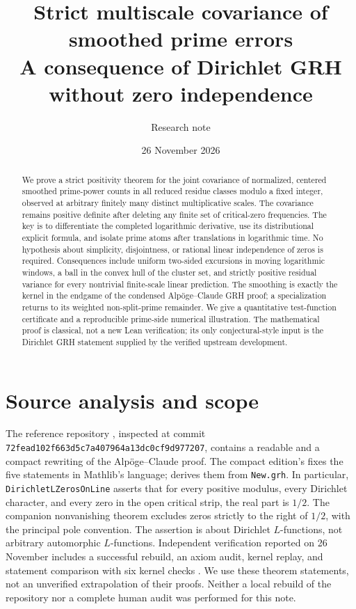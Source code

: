 \documentclass[11pt]{article}
\title{Strict multiscale covariance of smoothed prime errors\\[3pt]\large A consequence of Dirichlet GRH without zero independence}
\author{Research note}
\date{26 November 2026}
\theoremstyle{remark}\newtheorem{remark}[theorem]{Remark}
\begin{document}
\maketitle
\begin{abstract}
We prove a strict positivity theorem for the joint covariance of normalized, centered smoothed prime-power counts in all reduced residue classes modulo a fixed integer, observed at arbitrary finitely many distinct multiplicative scales. The covariance remains positive definite after deleting any finite set of critical-zero frequencies. The key is to differentiate the completed logarithmic derivative, use its distributional explicit formula, and isolate prime atoms after translations in logarithmic time. No hypothesis about simplicity, disjointness, or rational linear independence of zeros is required. Consequences include uniform two-sided excursions in moving logarithmic windows, a ball in the convex hull of the cluster set, and strictly positive residual variance for every nontrivial finite-scale linear prediction. The smoothing is exactly the kernel in the endgame of the condensed Alp\"oge--Claude GRH proof; a specialization returns to its weighted non-split-prime remainder. We give a quantitative test-function certificate and a reproducible prime-side numerical illustration. The mathematical proof is classical, not a new Lean verification; its only conjectural-style input is the Dirichlet GRH statement supplied by the verified upstream development.
\end{abstract}

\section{Source analysis and scope}
The reference repository \cite{repo}, inspected at commit
\texttt{72fead102f663d5c7a407964a13dc0cf9d977207}, contains a readable and a compact rewriting of the Alp\"oge--Claude proof. The compact edition's  fixes the five statements in Mathlib's language;  derives them from \texttt{New.grh}. In particular, \texttt{DirichletLZerosOnLine} asserts that for every positive modulus, every Dirichlet character, and every zero in the open critical strip, the real part is $1/2$. The companion nonvanishing theorem excludes zeros strictly to the right of $1/2$, with the principal pole convention. The assertion is about Dirichlet $L$-functions, not arbitrary automorphic $L$-functions. Independent verification reported on 26 November includes a successful rebuild, an axiom audit, kernel replay, and statement comparison with six kernel checks \cite{rubinstein}. We use these theorem statements, not an unverified extrapolation of their proofs. Neither a local rebuild of the repository nor a complete human audit was performed for this note.
\end{document}
